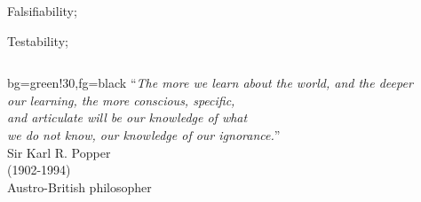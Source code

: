 \documentclass[t]{beamer}
\begin{document}
\begin{ftst}
\bitems Falsifiability;
	\item Testability;
\eitem
\vone
\begin{columns}[T]
	\begin{colorblock}{}{bg=green!30,fg=black}
	``\textit{The more we learn about the world, and the deeper\\
	our learning, the more conscious, specific,\\
	and articulate will be our knowledge of what\\
	we do not know, our knowledge of our ignorance.}''\\
	\flushright\vspace{-1em}\small Sir Karl R. Popper\\
	\flushright\vspace{-1em}\small (1902-1994)\\
	\flushright\vspace{-1em}\small Austro-British philosopher
	\end{colorblock}
\end{columns}
\end{ftst}
\end{document}
